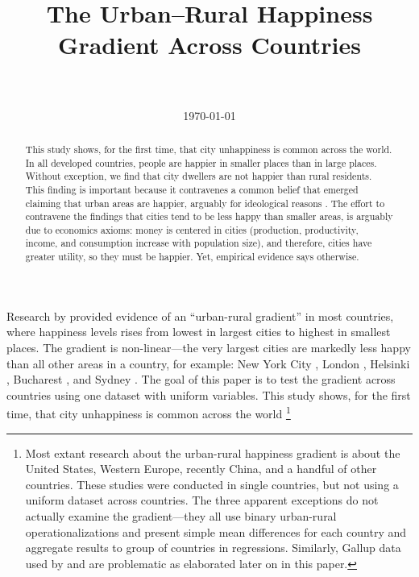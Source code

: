 \documentclass[10pt, letterpaper]{article}
\date{{}\today  \hspace{.2in}\xxivtime}
\title{  %
The Urban--Rural Happiness Gradient Across Countries\\
\\ 
}
\author{
}
\begin{document}


\maketitle
\vspace{-.4in}
\begin{center}

\end{center}
 

\begin{abstract}
This study shows, for the first time, that city unhappiness is 
common across the world. In all developed countries, people are happier in smaller places than in large places. Without exception, we find that city dwellers are not happier than rural residents. This finding is important because it contravenes a common belief that emerged claiming that urban areas are happier, arguably for ideological reasons \citep[e.g.,][]{glaeser11,glaeser14,burger20}. The effort to contravene the findings that cities tend to be less happy than smaller areas, is arguably due to economics axioms: money is centered in cities (production, productivity, income, and consumption increase with population size), and therefore, cities have greater utility, so they must be happier. Yet, empirical evidence says otherwise. 
\end{abstract}
\vspace{.15in} 
\noindent{\sc %
}
\vspace{.25in} 

Research by \cite{aok11a} provided evidence of an ``urban-rural gradient'' in most countries, where happiness levels rises from lowest in largest cities to highest in smallest places. The gradient is non-linear---the very largest cities are markedly less happy than all other areas in a country, for example: New York City \citep{aok_brfss_city_cize16,senior_ny_sep16_14}, London \citep{ons11,ibt13}, Helsinki \citep{morrison15}, Bucharest \citep{lenzi16D}, and Sydney \citep[cited in][]{morrison11}.
The goal of this paper is to test the gradient across countries using one dataset with uniform variables. This study shows, for the first time, that city unhappiness is common across the world \footnote{Most extant research about the urban-rural happiness gradient is about the United States, Western Europe, recently China, and a handful of other countries. These studies were conducted in single countries, but not using a uniform dataset across countries. The three apparent exceptions \citep{aokcities,burger20,easterlin10al} do not actually examine the gradient---they all use binary urban-rural operationalizations and present simple mean differences for each country and aggregate results to group of countries in regressions. Similarly, Gallup data used by \citet{burger20} and \citet{easterlin10al} are problematic as elaborated later on in this paper.}
 
\end{document}
